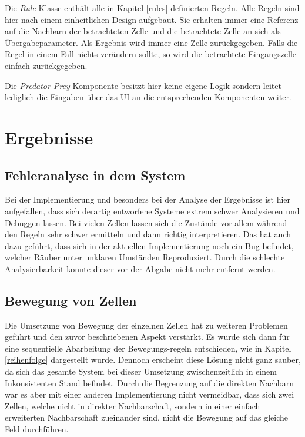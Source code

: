 \documentclass[]{scrartcl}
\begin{document}
Die \textit{Rule}-Klasse enthält alle in Kapitel \ref{rules} definierten Regeln. Alle Regeln sind hier nach einem einheitlichen Design aufgebaut. Sie erhalten immer eine Referenz auf die Nachbarn der betrachteten Zelle und die betrachtete Zelle an sich als Übergabeparameter. Als Ergebnis wird immer eine Zelle zurückgegeben. Falls die Regel in einem Fall nichts verändern sollte, so wird die betrachtete Eingangszelle einfach zurückgegeben.

Die \textit{Predator-Prey}-Komponente besitzt hier keine eigene Logik sondern leitet lediglich die Eingaben über das UI an die entsprechenden Komponenten weiter. 


\newpage
\section{Ergebnisse}
\label{ergebnisse}

\subsection{Fehleranalyse in dem System}
Bei der Implementierung und besonders bei der Analyse der Ergebnisse ist hier aufgefallen, dass sich derartig entworfene Systeme extrem schwer Analysieren und Debuggen lassen. Bei vielen Zellen lassen sich die Zustände vor allem während den Regeln sehr schwer ermitteln und dann richtig interpretieren. Das hat auch dazu geführt, dass sich in der aktuellen Implementierung noch ein Bug befindet, welcher Räuber unter unklaren Umständen Reproduziert. Durch die schlechte Analysierbarkeit konnte dieser vor der Abgabe nicht mehr entfernt werden.

\subsection{Bewegung von Zellen}
Die Umsetzung von Bewegung der einzelnen Zellen hat zu weiteren Problemen geführt und den zuvor beschriebenen Aspekt verstärkt. Es wurde sich dann für eine sequentielle Abarbeitung der Bewegungs-regeln entschieden, wie in Kapitel \ref{reihenfolge} dargestellt wurde. Dennoch erscheint diese Lösung nicht ganz sauber, da sich das gesamte System bei dieser Umsetzung zwischenzeitlich in einem Inkonsistenten Stand befindet. Durch die Begrenzung auf die direkten Nachbarn war es aber mit einer anderen Implementierung nicht vermeidbar, dass sich zwei Zellen, welche nicht in direkter Nachbarschaft, sondern in einer einfach erweiterten Nachbarschaft zueinander sind, nicht die Bewegung auf das gleiche Feld durchführen. 
\end{document}
